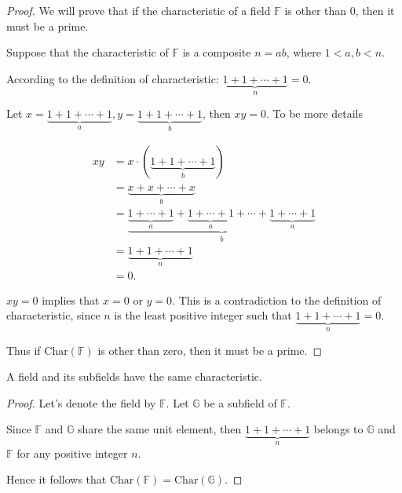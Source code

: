 \begin{proof}
    We will prove that if the characteristic of a field $\mathbb{F}$ is other than $0$, then it must be a prime.

    Suppose that the characteristic of $\mathbb{F}$ is a composite $n = ab$, where $1 < a, b < n$.

    According to the definition of characteristic: $\underbrace{1 + 1 + \cdots + 1}_{n} = 0$.

    Let $x = \underbrace{1 + 1 + \cdots + 1}_{a}, y = \underbrace{1 + 1 + \cdots + 1}_{b}$, then $xy = 0$. To be more details

    \begin{align*}
        xy & = x\cdot (\underbrace{1 + 1 + \cdots + 1}_{b})                                                                                  \\
           & = \underbrace{x + x + \cdots + x}_{b}                                                                                           \\
           & = \underbrace{\underbrace{1 + \cdots + 1}_{a} + \underbrace{1 + \cdots + 1}_{a} + \cdots + \underbrace{1 + \cdots + 1}_{a}}_{b} \\
           & = \underbrace{1 + 1 + \cdots + 1}_{n}                                                                                           \\
           & = 0.
    \end{align*}

    $xy = 0$ implies that $x = 0$ or $y = 0$. This is a contradiction to the definition of characteristic, since $n$ is the least positive integer such that $\underbrace{1 + 1 + \cdots + 1}_{n} = 0$.

    Thus if $\text{Char}(\mathbb{F})$ is other than zero, then it must be a prime.
\end{proof}

\begin{theorem}
    A field and its subfields have the same characteristic.
\end{theorem}

\begin{proof}
    Let's denote the field by $\mathbb{F}$. Let $\mathbb{G}$ be a subfield of $\mathbb{F}$.

    Since $\mathbb{F}$ and $\mathbb{G}$ share the same unit element, then $\underbrace{1 + 1 + \cdots + 1}_{n}$ belongs to $\mathbb{G}$ and $\mathbb{F}$ for any positive integer $n$.

    Hence it follows that $\text{Char}(\mathbb{F}) = \text{Char}(\mathbb{G})$.
\end{proof}

